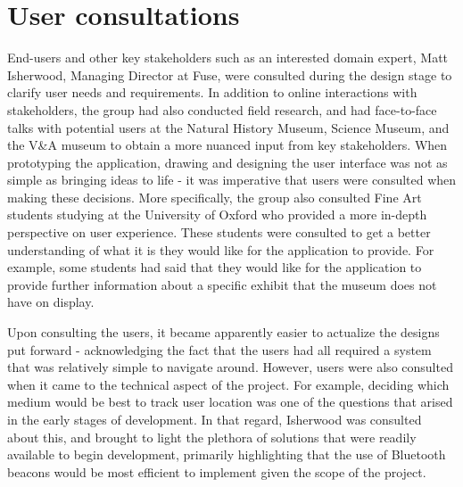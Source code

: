 \section{User consultations}
End-users and other key stakeholders such as an interested domain expert, Matt Isherwood, Managing Director at Fuse, were consulted during the design stage to clarify user needs and requirements. In addition to online interactions with stakeholders, the group had also conducted field research, and had face-to-face talks with potential users at the Natural History Museum, Science Museum, and the V\&A museum to obtain a more nuanced input from key stakeholders. When prototyping the application, drawing and designing the user interface was not as simple as bringing ideas to life - it was imperative that users were consulted when making these decisions. More specifically, the group also consulted Fine Art students studying at the University of Oxford who provided a more in-depth perspective on user experience. These students were consulted to get a better understanding of what it is they would like for the application to provide. For example, some students had said that they would like for the application to provide further information about a specific exhibit that the museum does not have on display.

Upon consulting the users, it became apparently easier to actualize the designs put forward - acknowledging the fact that the users had all required a system that was relatively simple to navigate around. However, users were also consulted when it came to the technical aspect of the project. For example, deciding which medium would be best to track user location was one of the questions that arised in the early stages of development. In that regard, Isherwood was consulted about this, and brought to light the plethora of solutions that were readily available to begin development, primarily highlighting that the use of Bluetooth beacons would be most efficient to implement given the scope of the project.